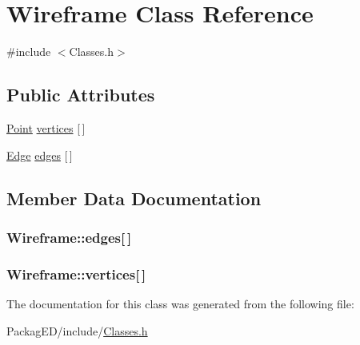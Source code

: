 \hypertarget{class_wireframe}{}\section{Wireframe Class Reference}
\label{class_wireframe}


{\ttfamily \#include $<$Classes.\+h$>$}

\subsection*{Public Attributes}
\begin{DoxyCompactItemize}
\item 
\hyperlink{class_point}{Point} \hyperlink{class_wireframe_aabbceba0ec194b6ec51c6881a97cd46a}{vertices} \mbox{[}$\,$\mbox{]}
\item 
\hyperlink{class_edge}{Edge} \hyperlink{class_wireframe_a909822e1ff36d03b8b86052b7008bc98}{edges} \mbox{[}$\,$\mbox{]}
\end{DoxyCompactItemize}


\subsection{Member Data Documentation}
\subsubsection[{\texorpdfstring{edges}{edges}}]{ Wireframe\+::edges\mbox{[}$\,$\mbox{]}}\hypertarget{class_wireframe_a909822e1ff36d03b8b86052b7008bc98}{}\label{class_wireframe_a909822e1ff36d03b8b86052b7008bc98}
\subsubsection[{\texorpdfstring{vertices}{vertices}}]{ Wireframe\+::vertices\mbox{[}$\,$\mbox{]}}\hypertarget{class_wireframe_aabbceba0ec194b6ec51c6881a97cd46a}{}\label{class_wireframe_aabbceba0ec194b6ec51c6881a97cd46a}


The documentation for this class was generated from the following file\+:\begin{DoxyCompactItemize}
\item 
Packag\+E\+D/include/\hyperlink{_classes_8h}{Classes.\+h}\end{DoxyCompactItemize}
